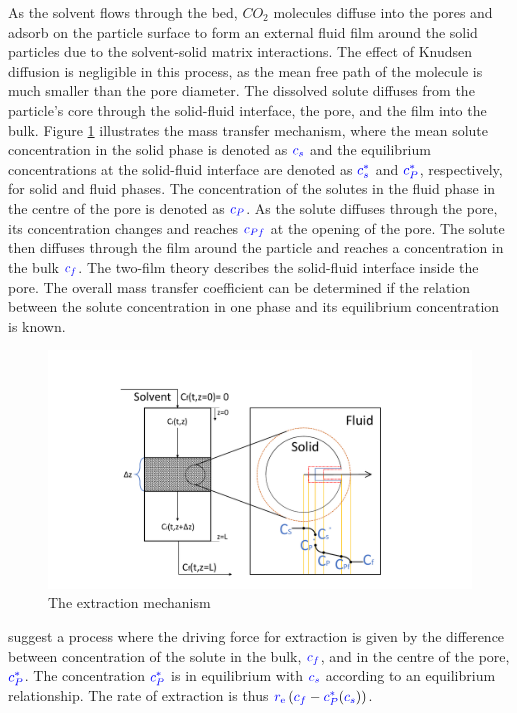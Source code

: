 \documentclass[../Article_Model_Parameters.tex]{subfiles}
\begin{document}
	As the solvent flows through the bed, $CO_2$ molecules diffuse into the pores and adsorb on the particle surface to form an external fluid film around the solid particles due to the solvent-solid matrix interactions. The effect of Knudsen diffusion is negligible in this process, as the mean free path of the molecule is much smaller than the pore diameter. The dissolved solute diffuses from the particle's core through the solid-fluid interface, the pore, and the film into the bulk. Figure \ref{fig: SFE_Mechanism} illustrates the mass transfer mechanism, where the mean solute concentration in the solid phase is denoted as ${\color{blue}c_s}$ and the equilibrium concentrations at the solid-fluid interface are denoted as ${\color{blue}c_s^*}$ and ${\color{blue}c_P^*}$, respectively, for solid and fluid phases. The concentration of the solutes in the fluid phase in the centre of the pore is denoted as ${\color{blue}c_{P}}$. As the solute diffuses through the pore, its concentration changes and reaches ${\color{blue}c_{Pf}}$ at the opening of the pore. The solute then diffuses through the film around the particle and reaches a concentration in the bulk ${\color{blue}c_f}$. The two-film theory describes the solid-fluid interface inside the pore. The overall mass transfer coefficient can be determined if the relation between the solute concentration in one phase and its equilibrium concentration is known.
			
		\begin{figure}[h!]
			\centering
			\includegraphics[trim = 5.8cm 1.1cm 6cm 3cm,clip,width=\columnwidth]{Figures/SFE_draft.pdf}	
			\caption{The extraction mechanism}
			\label{fig: SFE_Mechanism}
		\end{figure}
			
		\citet{Bulley1984} suggest a process where the driving force for extraction is given by the difference between concentration of the solute in the bulk, ${\color{blue}c_f}$, and in the centre of the pore, ${\color{blue}c_P^*}$. The concentration ${\color{blue}c_P^*}$ is in equilibrium with ${\color{blue}c_s}$ according to an equilibrium relationship. The rate of extraction is thus ${\color{blue}r_\text{e}}\left({\color{blue}c_f} - {\color{blue}c^*_P}({\color{blue}c_s})\right)$.  
			
\end{document}

